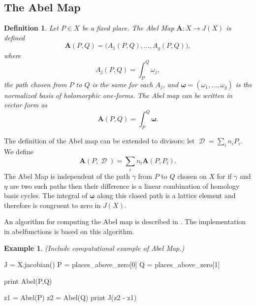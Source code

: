 \documentclass[12pt]{article}
\newtheorem{definition}[theorem]{Definition}
\theoremstyle{definition}
\newtheorem{example}[theorem]{Example}
\DeclareMathOperator{\DivD}{\mathcal{D}}
\begin{document}
\subsection{The Abel Map}


\begin{definition}\label{def:abelmap}
  Let $P \in X$ be a fixed place. The Abel Map $\boldsymbol{A} : X \to
  J(X)$ is defined
  \begin{equation} \label{eqn:abel1}
    \boldsymbol{A}(P,Q) = \big( A_1(P,Q), \ldots, A_g(P,Q) \big),
  \end{equation}
  where
  \begin{equation} \label{eqn:abel2}
    A_j(P,Q) = \int_P^Q \omega_j,
  \end{equation}
  the path chosen from $P$ to $Q$ is the same for each $A_j$, and
  $\boldsymbol{\omega} = (\omega_1,\ldots,\omega_g)$ is the normalized
  basis of holomorphic one-forms. The Abel map can be written in vector
  form as
  \begin{equation} \label{eqn:abel-vector}
    \boldsymbol{A}(P,Q) = \int_P^Q \boldsymbol{\omega}.
  \end{equation}
\end{definition}
The definition of the Abel map can be extended to divisors: let $\DivD =
\sum_i n_i P_i$. We define
\begin{equation} \label{eqn:abel-divisors}
  \boldsymbol{A}(P,\DivD) = \sum_i n_i \boldsymbol{A}(P,P_i).
\end{equation}
The Abel Map is independent of the path $\gamma$ from $P$ to $Q$ chosen
on $X$ for if $\gamma$ and $\eta$ are two such paths then their
difference is a linear combination of homology basis cycles. The
integral of $\boldsymbol{\omega}$ along this closed path is a lattice
element and therefore is congruent to zero in $J(X)$.

An algorithm for computing the Abel map is described in
\cite{DeconinckPatterson11}. The implementation in {\sc abelfunctions}
is based on this algorithm.

\begin{example}
  {\it (Include computational example of Abel Map.)}

\begin{ipythoninput}
J = X.jacobian()
P = places_above_zero[0]
Q = places_above_zero[1]

print Abel(P,Q)

z1 = Abel(P)
z2 = Abel(Q)
print J(z2 - z1)
\end{ipythoninput}
\begin{ipythonoutput}
[XXX]
\end{ipythonoutput}

\end{example}
\end{document}
